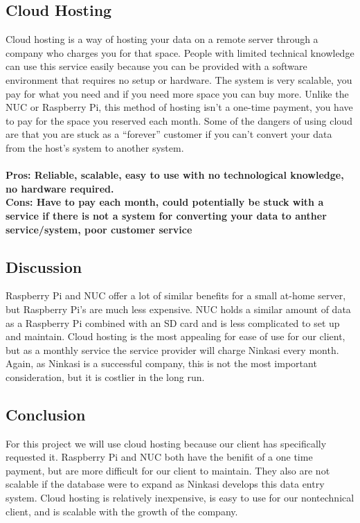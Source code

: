 \documentclass[draftclsnofoot,onecolumn,letterpaper,10pt,compsoc]{IEEEtran}
\begin{document}
			\subsection{Cloud Hosting}
		        Cloud hosting is a way of hosting your data on a remote server through a company who charges you for that space.
						People with limited technical knowledge can use this service easily because you can be provided with a software environment that requires no setup or hardware\cite{InterRoute}.
						The system is very scalable, you pay for what you need and if you need more space you can buy more\cite{InterRoute}.
						Unlike the NUC or Raspberry Pi, this method of hosting isn't a one-time payment, you have to pay for the space you reserved each month\cite{TheBalance}.
						Some of the dangers of using cloud are that you are stuck as a “forever” customer if you can't convert your data from the host's system to another system\cite{TheBalance}.
						\\ \\
						\textbf{Pros: Reliable, scalable, easy to use with no technological knowledge, no hardware required.}
						\\
						\textbf{Cons: Have to pay each month, could potentially be stuck with a service if there is not a system for converting your data to anther service/system, poor customer service}


					\subsection{Discussion}
						Raspberry Pi and NUC offer a lot of similar benefits for a small at-home server, but Raspberry Pi’s are much less expensive.
						NUC holds a similar amount of data as a Raspberry Pi combined with an SD card and is less complicated to set up and maintain.
						Cloud hosting is the most appealing for ease of use for our client, but as a monthly service the service provider will charge Ninkasi every month.
						Again, as Ninkasi is a successful company, this is not the most important consideration, but it is costlier in the long run.

						\subsection{Conclusion}
						For this project we will use cloud hosting because our client has specifically requested it.
            Raspberry Pi and NUC both have the benifit of a one time payment, but are more difficult for our client to maintain.
            They also are not scalable if the database were to expand as Ninkasi develops this data entry system.
						Cloud hosting is relatively inexpensive, is easy to use for our nontechnical client, and is scalable with the growth of the company.
\end{document}
